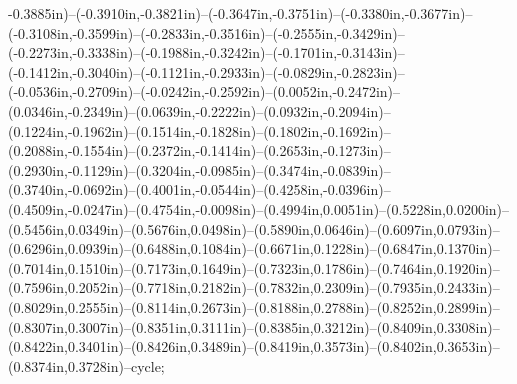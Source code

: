 -0.3885in)--(-0.3910in,-0.3821in)--(-0.3647in,-0.3751in)--(-0.3380in,-0.3677in)--(-0.3108in,-0.3599in)--(-0.2833in,-0.3516in)--(-0.2555in,-0.3429in)--(-0.2273in,-0.3338in)--(-0.1988in,-0.3242in)--(-0.1701in,-0.3143in)--(-0.1412in,-0.3040in)--(-0.1121in,-0.2933in)--(-0.0829in,-0.2823in)--(-0.0536in,-0.2709in)--(-0.0242in,-0.2592in)--(0.0052in,-0.2472in)--(0.0346in,-0.2349in)--(0.0639in,-0.2222in)--(0.0932in,-0.2094in)--(0.1224in,-0.1962in)--(0.1514in,-0.1828in)--(0.1802in,-0.1692in)--(0.2088in,-0.1554in)--(0.2372in,-0.1414in)--(0.2653in,-0.1273in)--(0.2930in,-0.1129in)--(0.3204in,-0.0985in)--(0.3474in,-0.0839in)--(0.3740in,-0.0692in)--(0.4001in,-0.0544in)--(0.4258in,-0.0396in)--(0.4509in,-0.0247in)--(0.4754in,-0.0098in)--(0.4994in,0.0051in)--(0.5228in,0.0200in)--(0.5456in,0.0349in)--(0.5676in,0.0498in)--(0.5890in,0.0646in)--(0.6097in,0.0793in)--(0.6296in,0.0939in)--(0.6488in,0.1084in)--(0.6671in,0.1228in)--(0.6847in,0.1370in)--(0.7014in,0.1510in)--(0.7173in,0.1649in)--(0.7323in,0.1786in)--(0.7464in,0.1920in)--(0.7596in,0.2052in)--(0.7718in,0.2182in)--(0.7832in,0.2309in)--(0.7935in,0.2433in)--(0.8029in,0.2555in)--(0.8114in,0.2673in)--(0.8188in,0.2788in)--(0.8252in,0.2899in)--(0.8307in,0.3007in)--(0.8351in,0.3111in)--(0.8385in,0.3212in)--(0.8409in,0.3308in)--(0.8422in,0.3401in)--(0.8426in,0.3489in)--(0.8419in,0.3573in)--(0.8402in,0.3653in)--(0.8374in,0.3728in)--cycle;
